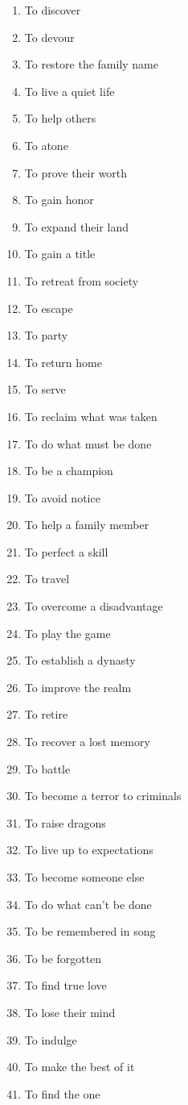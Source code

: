 \begin{enumerate}
\item To discover
\item To devour
\item To restore the family name
\item To live a quiet life
\item To help others
\item To atone
\item To prove their worth
\item To gain honor
\item To expand their land
\item To gain a title
\item To retreat from society
\item To escape
\item To party
\item To return home
\item To serve
\item To reclaim what was taken
\item To do what must be done
\item To be a champion
\item To avoid notice
\item To help a family member
\item To perfect a skill
\item To travel
\item To overcome a disadvantage
\item To play the game
\item To establish a dynasty
\item To improve the realm
\item To retire
\item To recover a lost memory
\item To battle
\item To become a terror to criminals
\item To raise dragons
\item To live up to expectations
\item To become someone else
\item To do what can't be done
\item To be remembered in song
\item To be forgotten
\item To find true love
\item To lose their mind
\item To indulge
\item To make the best of it
\item To find the one

\end{enumerate}

